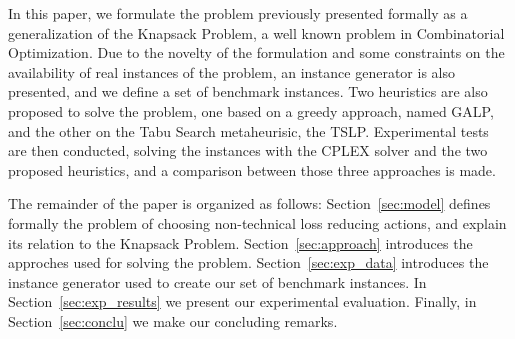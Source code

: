 In this paper, we formulate the problem previously presented formally as a generalization of the Knapsack Problem, a well known problem in 
Combinatorial Optimization. Due to the novelty of the formulation and some constraints on the availability of real instances of the problem, 
an instance generator is also presented, and we define a set of benchmark instances. Two heuristics are also proposed to solve the problem, one based on a greedy approach, 
named GALP, and the other on the Tabu Search metaheurisic, the TSLP. Experimental tests are then conducted, solving the instances with the CPLEX solver and the two proposed
heuristics, and a comparison between those three approaches is made.

The remainder of the paper is organized as follows: Section~\ref{sec:model} defines formally the
problem of choosing non-technical loss reducing actions, and explain its relation to the Knapsack Problem.
Section~\ref{sec:approach} introduces the approches used for solving the problem.
Section~\ref{sec:exp_data} introduces the instance generator used to create our set of benchmark instances. 
In Section~\ref{sec:exp_results} we present our experimental evaluation. Finally, in Section~\ref{sec:conclu} 
we make our concluding remarks.
